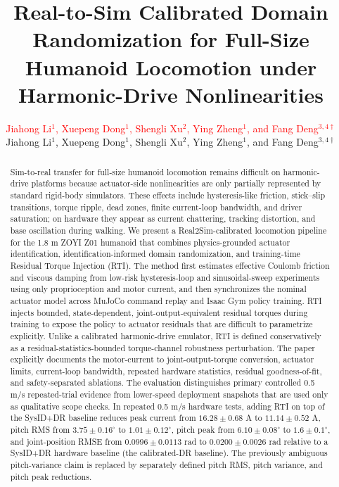 \documentclass[twoside,final,1p,times]{elsarticle}
\newcommand{\rev}[1]{#1}
\newcommand{\templrev}[1]{\ifmarkedred\textcolor{red}{#1}\else#1\fi}
\begin{document}
\begin{frontmatter}
\title{Real-to-Sim Calibrated Domain Randomization for Full-Size Humanoid Locomotion under Harmonic-Drive Nonlinearities}

\author{\templrev{Jiahong Li$^{1}$, Xuepeng Dong$^{1}$, Shengli Xu$^{2}$, Ying Zheng$^{1}$, and Fang Deng$^{3,4\dagger}$}}

\address{$^{1}$\templrev{College of Robotics, Beijing Union University, China}}
\address{\templrev{$^{2}$Beijing Zoyi Technology Co., Ltd., Beijing, China}}
\address{\templrev{$^{3}$State Key Lab of Autonomous Intelligent Unmanned Systems, Beijing Institute of Technology, Beijing, China}}
\address{\templrev{$^{4}$School of AI, Beijing Institute of Technology, Beijing, China}}

\begin{abstract}
Sim-to-real transfer for full-size humanoid locomotion remains difficult on harmonic-drive platforms because actuator-side nonlinearities are only partially represented by standard rigid-body simulators. These effects include hysteresis-like friction, stick--slip transitions, torque ripple, dead zones, finite current-loop bandwidth, and driver saturation; on hardware they appear as current chattering, tracking distortion, and base oscillation during walking. We present a Real2Sim-calibrated locomotion pipeline for the 1.8 m ZOYI Z01 humanoid that combines physics-grounded actuator identification, identification-informed domain randomization, and training-time Residual Torque Injection (RTI). The method first estimates effective Coulomb friction and viscous damping from low-risk hysteresis-loop and sinusoidal-sweep experiments using only proprioception and motor current, and then synchronizes the nominal actuator model across MuJoCo command replay and Isaac Gym policy training. RTI injects bounded, state-dependent, joint-output-equivalent residual torques during training to expose the policy to actuator residuals that are difficult to parametrize explicitly. \rev{Unlike a calibrated harmonic-drive emulator, RTI is defined conservatively as a residual-statistics-bounded torque-channel robustness perturbation. The paper explicitly documents the motor-current to joint-output-torque conversion, actuator limits, current-loop bandwidth, repeated hardware statistics, residual goodness-of-fit, and safety-separated ablations. The evaluation distinguishes primary controlled 0.5 m/s repeated-trial evidence from lower-speed deployment snapshots that are used only as qualitative scope checks.} In repeated 0.5 m/s hardware tests, adding RTI on top of the SysID+DR baseline reduces peak current from $16.28\pm0.68$ A to $11.14\pm0.52$ A, pitch RMS from $3.75\pm0.16^\circ$ to $1.01\pm0.12^\circ$, pitch peak from $6.10\pm0.08^\circ$ to $1.6\pm0.1^\circ$, and joint-position RMSE from $0.0996\pm0.0113$ rad to $0.0200\pm0.0026$ rad relative to a SysID+DR hardware baseline (the calibrated-DR baseline). \rev{The previously ambiguous pitch-variance claim is replaced by separately defined pitch RMS, pitch variance, and pitch peak reductions.}
\end{abstract}


\end{frontmatter}
\end{document}
